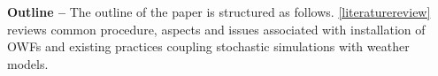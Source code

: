 \textbf{Outline --}
The outline of the paper is structured as follows. \ref{literaturereview} reviews common procedure, aspects and issues associated with installation of OWFs and existing practices coupling stochastic simulations with weather models.